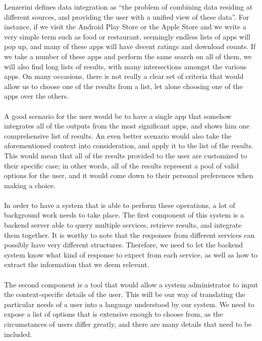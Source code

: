 Lenzerini\cite{lenzerini} defines data integration as ``the problem of combining data residing at different sources, and providing the user with a unified view of these data''. For instance, if we visit the Android Play Store or the Apple Store and we write a very simple term such as food or restaurant, seemingly endless lists of apps will pop up, and many of these apps will have decent ratings and download counts. If we take a number of these apps and perform the same search on all of them, we will also find long lists of results, with many intersections amongst the various apps. On many occasions, there is not really a clear set of criteria that would allow us to choose one of the results from a list, let alone choosing one of the apps over the others.\\\\
A good scenario for the user would be to have a single app that somehow integrates all of the outputs from the most significant apps, and shows him one comprehensive list of results. An even better scenario would also take the aforementioned context into consideration, and apply it to the list of the results. This would mean that all of the results provided to the user are customized to their specific case; in other words, all of the results represent a pool of valid options for the user, and it would come down to their personal preferences when making a choice.\\\\
In order to have a system that is able to perform these operations, a lot of background work needs to take place. The first component of this system is a backend server able to query multiple services, retrieve results, and integrate them together. It is worthy to note that the responses from different services can possibly have very different structures. Therefore, we need to let the backend system know what kind of response to expect from each service, as well as how to extract the information that we deem relevant.\\\\
The second component is a tool that would allow a system administrator to input the context-specific details of the user. This will be our way of translating the particular needs of a user into a language understood by our system. We need to expose a list of options that is extensive enough to choose from, as the circumstances of users differ greatly, and there are many details that need to be included.\\\\
